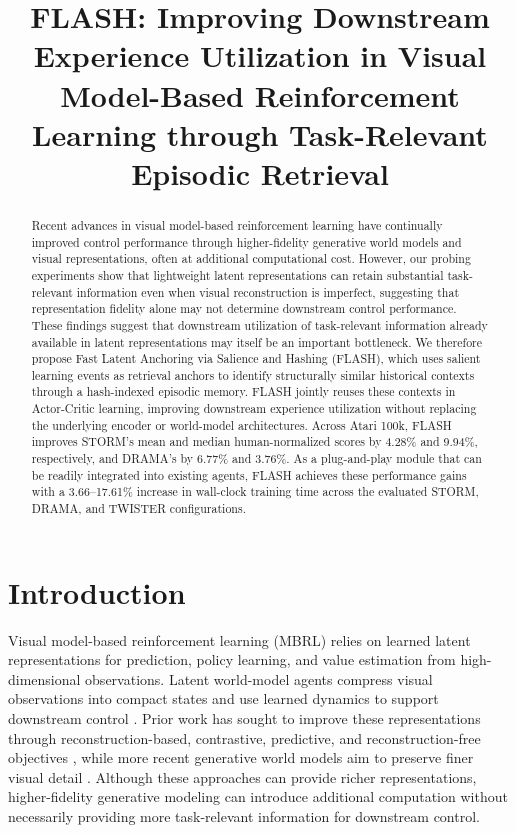 \documentclass{article} %
\title{FLASH: Improving Downstream Experience Utilization in Visual Model-Based Reinforcement Learning through Task-Relevant Episodic Retrieval}
\begin{document}
\maketitle

\begin{abstract}
Recent advances in visual model-based reinforcement learning have continually improved control performance through higher-fidelity generative world models and visual representations, often at additional computational cost. However, our probing experiments show that lightweight latent representations can retain substantial task-relevant information even when visual reconstruction is imperfect, suggesting that representation fidelity alone may not determine downstream control performance. These findings suggest that downstream utilization of task-relevant information already available in latent representations may itself be an important bottleneck. We therefore propose Fast Latent Anchoring via Salience and Hashing (FLASH), which uses salient learning events as retrieval anchors to identify structurally similar historical contexts through a hash-indexed episodic memory. FLASH jointly reuses these contexts in Actor-Critic learning, improving downstream experience utilization without replacing the underlying encoder or world-model architectures. Across Atari 100k, FLASH improves STORM's mean and median human-normalized scores by 4.28\% and 9.94\%, respectively, and DRAMA's by 6.77\% and 3.76\%. As a plug-and-play module that can be readily integrated into existing agents, FLASH achieves these performance gains with a 3.66--17.61\% increase in wall-clock training time across the evaluated STORM, DRAMA, and TWISTER configurations.

\end{abstract}



\section{Introduction}
\label{sec:intro}

Visual model-based reinforcement learning (MBRL) relies on learned latent representations for prediction, policy learning, and value estimation from high-dimensional observations. Latent world-model agents compress visual observations into compact states and use learned dynamics to support downstream control \citep{hafner2019dream, hafner2020mastering, zhang2023storm, wang2025drama}. Prior work has sought to improve these representations through reconstruction-based, contrastive, predictive, and reconstruction-free objectives \citep{hafner2019learning, laskin2020curl, schwarzer2020data, stooke2021decoupling, deng2022dreamerpro}, while more recent generative world models aim to preserve finer visual detail \citep{alonso2024diffusion, lee2026edeline}. Although these approaches can provide richer representations, higher-fidelity generative modeling can introduce additional computation without necessarily providing more task-relevant information for downstream control.
\end{document}
